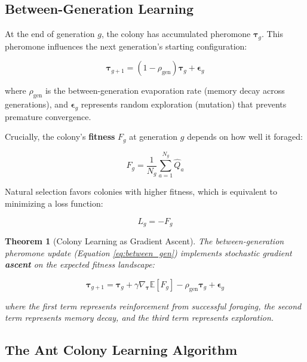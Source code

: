 \documentclass[12pt,letterpaper]{article}
\newtheorem{theorem}{Theorem}[section]
\begin{document}
\subsection{Between-Generation Learning}

At the end of generation $g$, the colony has accumulated pheromone $\boldsymbol{\tau}_g$. This pheromone influences the next generation's starting configuration:

\begin{equation}
\boldsymbol{\tau}_{g+1} = (1-\rho_{\text{gen}})\boldsymbol{\tau}_g + \boldsymbol{\epsilon}_g \label{eq:between_gen}
\end{equation}

where $\rho_{\text{gen}}$ is the between-generation evaporation rate (memory decay across generations), and $\boldsymbol{\epsilon}_g$ represents random exploration (mutation) that prevents premature convergence.

Crucially, the colony's \textbf{fitness} $F_g$ at generation $g$ depends on how well it foraged:

\begin{equation}
F_g = \frac{1}{N_g} \sum_{a=1}^{N_g} \hat{Q}_{a} \label{eq:fitness}
\end{equation}

Natural selection favors colonies with higher fitness, which is equivalent to minimizing a loss function:

\begin{equation}
L_g = -F_g \label{eq:loss_from_fitness}
\end{equation}

\begin{theorem}[Colony Learning as Gradient Ascent]
The between-generation pheromone update (Equation \ref{eq:between_gen}) implements stochastic gradient \textbf{ascent} on the expected fitness landscape:

\begin{equation}
\boldsymbol{\tau}_{g+1} = \boldsymbol{\tau}_g + \gamma \nabla_{\boldsymbol{\tau}} \mathbb{E}[F_g] - \rho_{\text{gen}} \boldsymbol{\tau}_g + \boldsymbol{\epsilon}_g \label{eq:colony_gradient}
\end{equation}

where the first term represents reinforcement from successful foraging, the second term represents memory decay, and the third term represents exploration.
\end{theorem}

\subsection{The Ant Colony Learning Algorithm}
\end{document}
